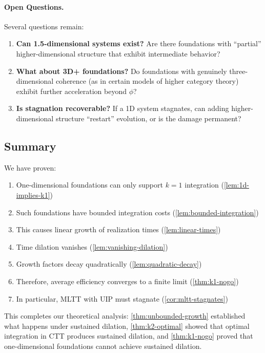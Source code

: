 \documentclass[11pt]{article}
\theoremstyle{definition}
\theoremstyle{remark}
\begin{document}
\paragraph{Open Questions.}

Several questions remain:

\begin{enumerate}
\item \textbf{Can 1.5-dimensional systems exist?} Are there foundations with ``partial'' higher-dimensional structure that exhibit intermediate behavior?

\item \textbf{What about 3D+ foundations?} Do foundations with genuinely three-dimensional coherence (as in certain models of higher category theory) exhibit further acceleration beyond $\phi$?

\item \textbf{Is stagnation recoverable?} If a 1D system stagnates, can adding higher-dimensional structure ``restart'' evolution, or is the damage permanent?
\end{enumerate}

\subsection{Summary}

We have proven:
\begin{enumerate}
\item One-dimensional foundations can only support $k = 1$ integration (\cref{lem:1d-implies-k1})
\item Such foundations have bounded integration costs (\cref{lem:bounded-integration})
\item This causes linear growth of realization times (\cref{lem:linear-times})
\item Time dilation vanishes (\cref{lem:vanishing-dilation})
\item Growth factors decay quadratically (\cref{lem:quadratic-decay})
\item Therefore, average efficiency converges to a finite limit (\cref{thm:k1-nogo})
\item In particular, MLTT with UIP must stagnate (\cref{cor:mltt-stagnates})
\end{enumerate}

This completes our theoretical analysis: \cref{thm:unbounded-growth} established what happens under sustained dilation, \cref{thm:k2-optimal} showed that optimal integration in CTT produces sustained dilation, and \cref{thm:k1-nogo} proved that one-dimensional foundations cannot achieve sustained dilation.
\end{document}
